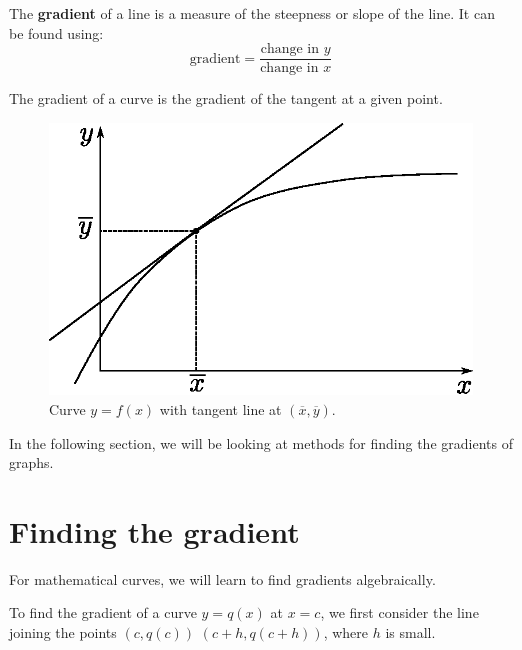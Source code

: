 \begin{definition}
The \textbf{gradient} of a line is a measure of the steepness or slope of the line. It can be found using:
$$\text{gradient}=\frac{\text{change in }y}{\text{change in }x}$$

The gradient of a curve is the gradient of the tangent at a given point.
\begin{figure}[H]
\centering
\includegraphics[scale=0.8]{img/tangent-line}
\caption{Curve $y=f(x)$ with tangent line at $(\overline{x},\overline{y})$.}
\label{fig:tangent-line}
\end{figure}

\end{definition}

In the following section, we will be looking at methods for finding the gradients of graphs.

\section{Finding the gradient}

For mathematical curves, we will learn to find gradients algebraically.

To find the gradient of a curve $y=q(x)$ at $x=c$, we first consider the line joining the points $(c,q(c))$ $(c+h,q(c+h))$, where $h$ is small.

